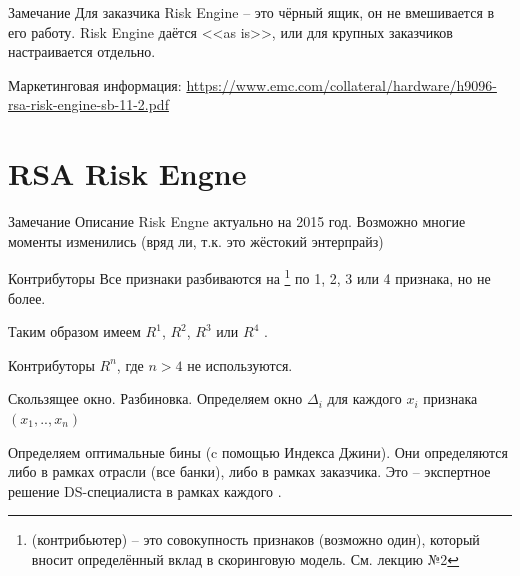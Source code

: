 \begin{frame}
	\begin{block}{Замечание}
		Для заказчика Risk Engine -- это чёрный ящик,
		он не вмешивается в его работу. 
		Risk Engine даётся <<as is>>, 
		или для крупных заказчиков настраивается отдельно.
	\end{block}
	\small
	Маркетинговая информация: \url{https://www.emc.com/collateral/hardware/h9096-rsa-risk-engine-sb-11-2.pdf}
\end{frame}

\begin{frame}
	
\end{frame}


\section{RSA Risk Engne}

\begin{frame}
	\begin{block}{Замечание}
	Описание Risk Engne актуально на 2015 год. Возможно многие моменты изменились 
	(вряд ли, т.к. это жёстокий энтерпрайз)
	\end{block}
\end{frame}


\begin{frame}{Контрибуторы}
	Все признаки разбиваются на 
	\footnote{ (контрибьютер) -- это совокупность признаков (возможно один),
	который вносит определённый вклад в скоринговую модель. См. лекцию №2}
	по 1, 2, 3 или 4 признака, но не более. 
	
	Таким образом имеем $R^1$, $R^2$, $R^3$ или $R^4$ .
	
	Контрибуторы $R^n$, где $n>4$ не используются.	
\end{frame}

\begin{frame}{Скользящее окно. Разбиновка.}
	\footnotesize
	Определяем окно $\Delta_i$ для каждого $x_i$ признака 
	$(x_1, .., x_n)$
	\begin{center}
		\begin{tikzpicture}[scale=1.5]
			
		\end{tikzpicture}
	\end{center}
	Определяем оптимальные бины (c помощью Индекса Джини).
	Они определяются либо в рамках отрасли (все банки), либо в рамках заказчика.
	Это -- экспертное решение DS-специалиста в рамках каждого .
\end{frame}

